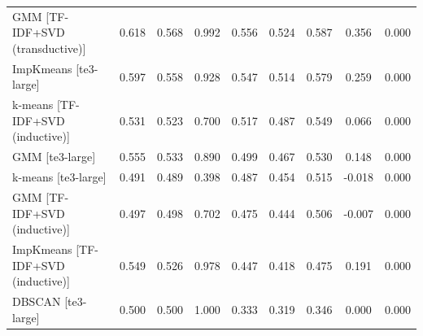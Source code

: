 \begin{table}[htbp]
\begin{tabular}{lcccccccc}
GMM [TF-IDF+SVD (transductive)] & 0.618 & 0.568 & 0.992 & 0.556 & 0.524 & 0.587 & 0.356 & 0.000 \\
ImpKmeans [te3-large] & 0.597 & 0.558 & 0.928 & 0.547 & 0.514 & 0.579 & 0.259 & 0.000 \\
k-means [TF-IDF+SVD (inductive)] & 0.531 & 0.523 & 0.700 & 0.517 & 0.487 & 0.549 & 0.066 & 0.000 \\
GMM [te3-large] & 0.555 & 0.533 & 0.890 & 0.499 & 0.467 & 0.530 & 0.148 & 0.000 \\
k-means [te3-large] & 0.491 & 0.489 & 0.398 & 0.487 & 0.454 & 0.515 & -0.018 & 0.000 \\
GMM [TF-IDF+SVD (inductive)] & 0.497 & 0.498 & 0.702 & 0.475 & 0.444 & 0.506 & -0.007 & 0.000 \\
ImpKmeans [TF-IDF+SVD (inductive)] & 0.549 & 0.526 & 0.978 & 0.447 & 0.418 & 0.475 & 0.191 & 0.000 \\
DBSCAN [te3-large] & 0.500 & 0.500 & 1.000 & 0.333 & 0.319 & 0.346 & 0.000 & 0.000 \\
\bottomrule
\end{tabular}
\end{table}